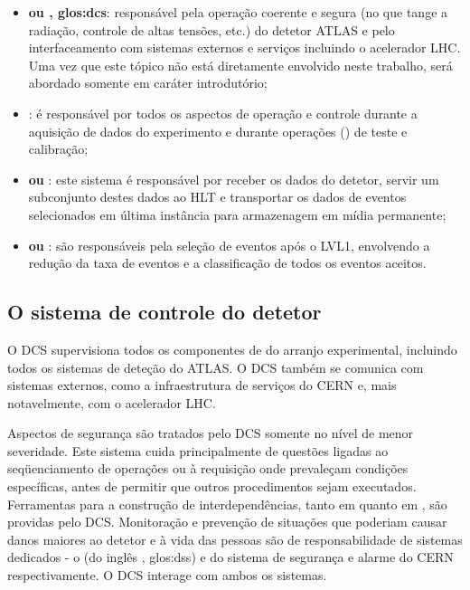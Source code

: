 \begin{itemize}
\item \textbf{ ou , \gls{glos:dcs}}: responsável pela operação coerente e segura (no que tange
a radiação, controle de altas tensões, etc.) do detetor ATLAS e pelo
interfaceamento com sistemas externos e serviços incluindo o acelerador
LHC. Uma vez que este tópico não está diretamente envolvido neste trabalho,
será abordado somente em caráter introdutório;

\item \textbf{}: é responsável por todos os aspectos de
operação e controle durante a aquisição de dados do experimento e durante
operações () de teste e calibração;

\item \textbf{ ou }: este sistema é
responsável por receber os dados do detetor, servir um subconjunto destes
dados ao HLT e transportar os dados de eventos selecionados em última
instância para armazenagem em mídia permanente;

\item \textbf{ ou }: são responsáveis pela
seleção de eventos após o LVL1, envolvendo a redução da taxa de eventos e a
classificação de todos os eventos aceitos.

\end{itemize}

\subsection{O sistema de controle do detetor}
\label{sec:dcs}

O DCS supervisiona todos os componentes de  do arranjo
experimental, incluindo todos os sistemas de deteção do ATLAS. O DCS também se
comunica com sistemas externos, como a infraestrutura de serviços do CERN e,
mais notavelmente, com o acelerador LHC.

Aspectos de segurança são tratados pelo DCS somente no nível de menor
severidade. Este sistema cuida principalmente de questões ligadas ao
seqüenciamento de operações ou à requisição onde prevaleçam condições
específicas, antes de permitir que outros procedimentos sejam
executados. Ferramentas para a construção de interdependências, tanto em
 quanto em , são providas pelo DCS. Monitoração e
prevenção de situações que poderiam causar danos maiores ao detetor e à vida
das pessoas são de responsabilidade de sistemas dedicados - o  (do inglês , \gls{glos:dss}) e
do sistema de segurança e alarme do CERN respectivamente. O DCS interage com
ambos os sistemas.

